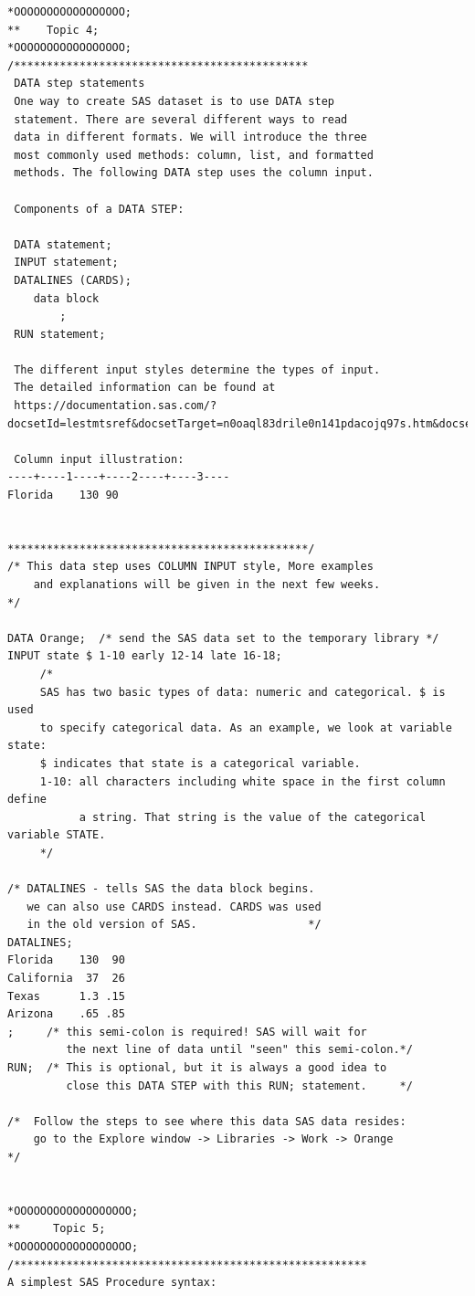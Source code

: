 \documentclass[
]{book}
\begin{document}
\begin{verbatim}
*OOOOOOOOOOOOOOOOO;
**    Topic 4; 
*OOOOOOOOOOOOOOOOO;
/*********************************************
 DATA step statements
 One way to create SAS dataset is to use DATA step
 statement. There are several different ways to read 
 data in different formats. We will introduce the three
 most commonly used methods: column, list, and formatted
 methods. The following DATA step uses the column input.

 Components of a DATA STEP:

 DATA statement;
 INPUT statement;
 DATALINES (CARDS);
    data block
        ;
 RUN statement;

 The different input styles determine the types of input.
 The detailed information can be found at
 https://documentation.sas.com/?docsetId=lestmtsref&docsetTarget=n0oaql83drile0n141pdacojq97s.htm&docsetVersion=9.4&locale=en#p0ert9pwdtsq4en1czu9tcrncgm8

 Column input illustration:
----+----1----+----2----+----3----
Florida    130 90


**********************************************/
/* This data step uses COLUMN INPUT style, More examples
    and explanations will be given in the next few weeks.
*/

DATA Orange;  /* send the SAS data set to the temporary library */        
INPUT state $ 1-10 early 12-14 late 16-18; 
     /*
     SAS has two basic types of data: numeric and categorical. $ is used 
     to specify categorical data. As an example, we look at variable state:
     $ indicates that state is a categorical variable.
     1-10: all characters including white space in the first column define 
           a string. That string is the value of the categorical variable STATE.     
     */

/* DATALINES - tells SAS the data block begins.
   we can also use CARDS instead. CARDS was used
   in the old version of SAS.                 */
DATALINES; 
Florida    130  90
California  37  26
Texas      1.3 .15
Arizona    .65 .85
;     /* this semi-colon is required! SAS will wait for
         the next line of data until "seen" this semi-colon.*/
RUN;  /* This is optional, but it is always a good idea to
         close this DATA STEP with this RUN; statement.     */

/*  Follow the steps to see where this data SAS data resides:
    go to the Explore window -> Libraries -> Work -> Orange
*/


*OOOOOOOOOOOOOOOOOO;
**     Topic 5;
*OOOOOOOOOOOOOOOOOO;
/******************************************************
A simplest SAS Procedure syntax:


\end{verbatim}
\end{document}
